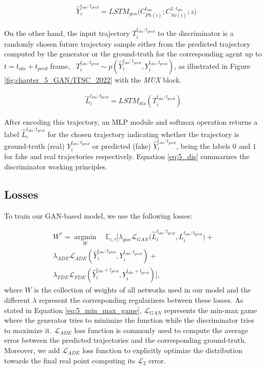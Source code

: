 \begin{eqnarray}
	\label{eq:5_gen_dec}
	& \hat{Y}_i^{t_{obs}:t_{pred}} = LSTM_{gen}\big(C_{Ph(i)}^{t_{obs}}; C_{So(i)}^{1:t_{obs}}; z\big)
\end{eqnarray}

On the other hand, the input trajectory $T_i^{t_{obs}:t_{pred}}$ to the discriminator is a randomly chosen future trajectory sample either from the predicted trajectory computed by the generator or the ground-truth for the corresponding agent up to $t = t_{obs} + t_{pred}$ frame, \ie \ $T_i^{t_{obs}:t_{pred}}\sim p(\hat{Y}_i^{t_{obs}:t_{pred}},Y_i^{t_{obs}:t_{pred}})$, as illustrated in Figure \ref{fig:chapter_5_GAN/ITSC_2022} with the \textit{MUX} block.

\begin{eqnarray}
	\label{eq:5_dis}
	\hat{L}_{i}^{t_{obs}:t_{pred}} = LSTM_{dis}(T_i^{t_{obs}:t_{pred}})
\end{eqnarray}

After encoding this trajectory, an \ac{MLP} module and softmax operation returns a label $\hat{L}_{i}^{t_{obs}:t_{pred}}$ for the chosen trajectory indicating whether the trajectory is ground-truth (real) $Y_i^{t_{obs}:t_{pred}}$ or predicted (fake) $\hat{Y}_i^{t_{obs}:t_{pred}}$, being the labels $0$ and $1$ for fake and real trajectories respectively. Equation \ref{eq:5_dis} summarizes the discriminator working principles. 

\subsection{Losses}
\label{subsec:5_losses}

To train our \ac{GAN}-based model, we use the following losses:

\begin{eqnarray}
	\label{eq:obj}
	W^* =\operatorname*{argmin}_W \quad\mathbb{E}_{i,\tau}[\lambda_{gan} \mathcal{L}_{GAN}\big(\hat{L}_{i}^{t_{obs}:t_{pred}}, L_{i}^{t_{obs}:t_{pred}} \big)+ \nonumber\\
	\lambda_{ADE} \mathcal{L}_{ADE}(\hat{Y}_i^{t_{obs}:t_{pred}},Y_i^{t_{obs}:t_{pred}})+ \nonumber\\
	\lambda_{FDE} \mathcal{L}_{FDE}(\hat{Y}_i^{t_{obs}+t_{pred}},Y_i^{t_{obs}+t_{pred}})],
\end{eqnarray}
%
where $W$ is the collection of weights of all networks used in our model and the different $\lambda$ represent the corresponding regularizers between these losses. As stated in Equation \ref{eq:5_min_max_game}, $\mathcal{L}_{GAN}$ represents the min-max game where the generator tries to minimize the function while the discriminator tries to maximize it. $\mathcal{L}_{ADE}$ loss function is commonly used to compute the average error between the predicted trajectories and the corresponding ground-truth. Moreover, we add $\mathcal{L}_{ADE}$ loss function to explicitly optimize the distribution towards the final real point computing its $\mathcal{L}_2$ error.

